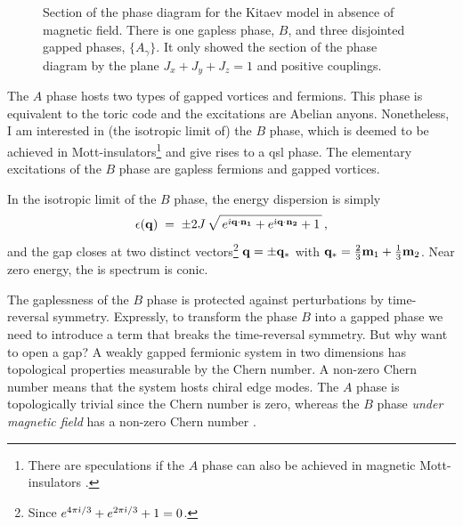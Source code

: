 \begin{figure}[t]
    \centering
    \caption{Section of the phase diagram for the Kitaev model in absence of magnetic field. There is one gapless phase, $B$, and three disjointed gapped phases, $\{A_{\gamma}\}$. It only showed the section of the phase diagram by the plane $J_x + J_y+J_z = 1$ and positive couplings.  }%
    \label{fig:2-triangle-phase-diag}%
\end{figure}


The $A$  phase hosts two types of gapped vortices %
and fermions. This phase is equivalent to the toric code \cite{Kitaev_2003, Kitaev_2006} and the excitations are Abelian anyons. Nonetheless, I am interested in (the isotropic limit of) the $B$ phase, which is deemed to be achieved in Mott-insulators\footnote{There are speculations if the $A$ phase can also be achieved in magnetic Mott-insulators \cite{takahashi2021topological}.} and give rises to a \acrshort{qsl} phase. The elementary excitations of the $B$ phase are gapless fermions and gapped vortices.

In the isotropic limit of the $B$ phase, the energy dispersion is simply
\begin{equation}
    \epsilon(\bf{q}) \; = \; \pm 2J \, \sqrt{ \,   e^{\im \bf{q}\cdot \bf{n_1}} +  e^{\im \bf{q}\cdot \bf{n_2}} + 1 \, } \, ,
\end{equation}
and the gap closes at two distinct vectors\footnote{Since $e^{4 \pi \im/3} + e^{2\pi \im/3}+1 = 0$.} $\bf{q} = \pm \bf{q}_{\ast}$ with $\bf{q}_{\ast} = \frac{2}{3}\bf{m}_1+\frac{1}{3}\bf{m}_2$. Near zero energy, the is spectrum is conic. 


The gaplessness of the $B$ phase is protected against perturbations by time-reversal symmetry\cite{Kitaev_2006}. Expressly, to transform the phase $B$ into a gapped phase we need to introduce a term that breaks the time-reversal symmetry. But why want to open a gap? A weakly gapped  fermionic system in two dimensions has topological properties measurable by the Chern number. A non-zero Chern number means that the system hosts chiral edge modes. The $A$ phase is topologically trivial since the Chern number is zero, whereas the $B$ phase \textit{under magnetic field} has a non-zero Chern number \cite{Kitaev_2006}.

